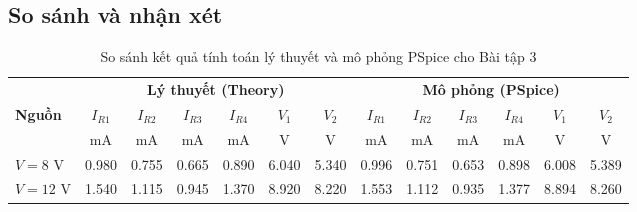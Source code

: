 \subsection{So sánh và nhận xét}
\begin{table}[H]
  \centering
  \caption{So sánh kết quả tính toán lý thuyết và mô phỏng PSpice cho Bài tập 3}
  \small
  \setlength{\tabcolsep}{3.5pt}
  \begin{tabular}{lcccccccccccc}
    \toprule
    & \multicolumn{6}{c}{\textbf{Lý thuyết (Theory)}} & \multicolumn{6}{c}{\textbf{Mô phỏng (PSpice)}} \\
    \cmidrule(lr){2-7}\cmidrule(lr){8-13}
    \textbf{Nguồn} & $I_{R1}$ & $I_{R2}$ & $I_{R3}$ & $I_{R4}$ & $V_1$ & $V_2$ & $I_{R1}$ & $I_{R2}$ & $I_{R3}$ & $I_{R4}$ & $V_1$ & $V_2$ \\
    & {\scriptsize mA} & {\scriptsize mA} & {\scriptsize mA} & {\scriptsize mA} & {\scriptsize V} & {\scriptsize V} & {\scriptsize mA} & {\scriptsize mA} & {\scriptsize mA} & {\scriptsize mA} & {\scriptsize V} & {\scriptsize V} \\
    \midrule
    $V = 8\text{ V}$ & 0.980 & 0.755 & 0.665 & 0.890 & 6.040 & 5.340 & 0.996 & 0.751 & 0.653 & 0.898 & 6.008 & 5.389 \\
    $V = 12\text{ V}$ & 1.540 & 1.115 & 0.945 & 1.370 & 8.920 & 8.220 & 1.553 & 1.112 & 0.935 & 1.377 & 8.894 & 8.260 \\
    \bottomrule
  \end{tabular}
\end{table}
